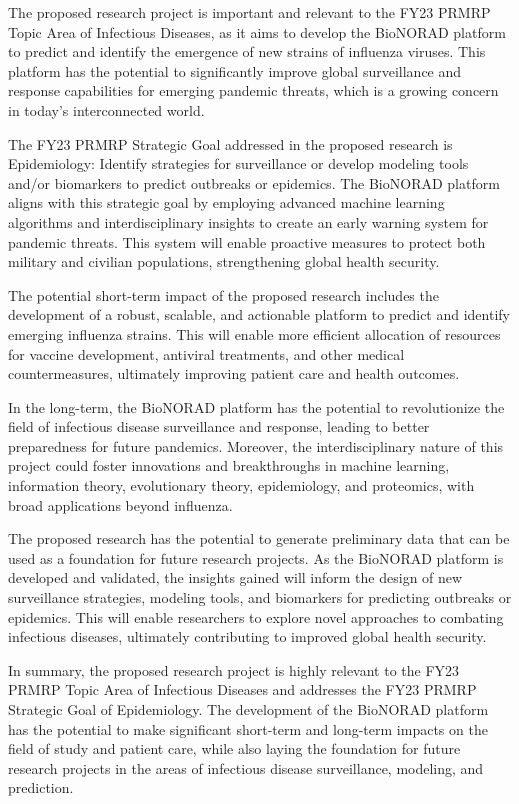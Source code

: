 \documentclass[onecolumn, compsoc,12pt]{IEEEtran}
\begin{document}
The proposed research project is important and relevant to the FY23 PRMRP Topic Area of Infectious Diseases, as it aims to develop the BioNORAD platform to predict and identify the emergence of new strains of influenza viruses. This platform has the potential to significantly improve global surveillance and response capabilities for emerging pandemic threats, which is a growing concern in today's interconnected world.

The FY23 PRMRP Strategic Goal addressed in the proposed research is Epidemiology: Identify strategies for surveillance or develop modeling tools and/or biomarkers to predict outbreaks or epidemics. The BioNORAD platform aligns with this strategic goal by employing advanced machine learning algorithms and interdisciplinary insights to create an early warning system for pandemic threats. This system will enable proactive measures to protect both military and civilian populations, strengthening global health security.

The potential short-term impact of the proposed research includes the development of a robust, scalable, and actionable platform to predict and identify emerging influenza strains. This will enable more efficient allocation of resources for vaccine development, antiviral treatments, and other medical countermeasures, ultimately improving patient care and health outcomes.

In the long-term, the BioNORAD platform has the potential to revolutionize the field of infectious disease surveillance and response, leading to better preparedness for future pandemics. Moreover, the interdisciplinary nature of this project could foster innovations and breakthroughs in machine learning, information theory, evolutionary theory, epidemiology, and proteomics, with broad applications beyond influenza.

The proposed research has the potential to generate preliminary data that can be used as a foundation for future research projects. As the BioNORAD platform is developed and validated, the insights gained will inform the design of new surveillance strategies, modeling tools, and biomarkers for predicting outbreaks or epidemics. This will enable researchers to explore novel approaches to combating infectious diseases, ultimately contributing to improved global health security.

In summary, the proposed research project is highly relevant to the FY23 PRMRP Topic Area of Infectious Diseases and addresses the FY23 PRMRP Strategic Goal of Epidemiology. The development of the BioNORAD platform has the potential to make significant short-term and long-term impacts on the field of study and patient care, while also laying the foundation for future research projects in the areas of infectious disease surveillance, modeling, and prediction.
\end{document}
